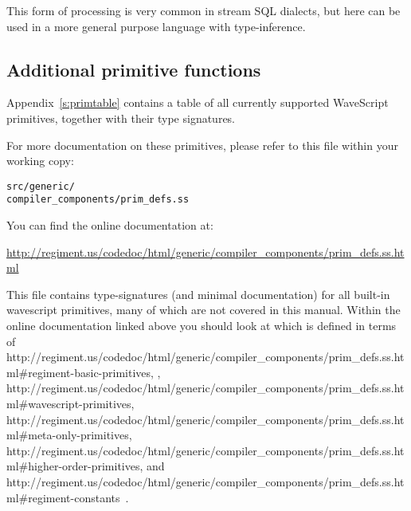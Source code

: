 \documentclass[twocolumn]{report}
\newcommand{\ws}{WaveScript}
\begin{document}
This form of processing is very common in stream SQL dialects, but
here can be used in a more general purpose language with type-inference.

\subsection{Additional primitive functions}

Appendix~\ref{s:primtable} contains a table of all currently supported
{\ws} primitives, together with their type signatures.

For more documentation on these primitives, please refer to this file
within your working copy:
\vspace{-2mm}
\begin{center}
{\tt{src/generic/\\compiler\_components/prim\_defs.ss}}
\end{center}

You can find the online documentation at:
\vspace{-2mm}
\begin{center}
\url{http://regiment.us/codedoc/html/generic/compiler\_components/prim\_defs.ss.html}
\end{center}




This file contains type-signatures (and minimal documentation) for all built-in
wavescript primitives, many of which are not covered in this manual.
Within the online documentation linked above you should look at 
which is defined in terms of 
      {http://regiment.us/codedoc/html/generic/compiler\_components/prim\_defs.ss.html\#regiment-basic-primitives},
,
          {http://regiment.us/codedoc/html/generic/compiler\_components/prim\_defs.ss.html\#wavescript-primitives},
           {http://regiment.us/codedoc/html/generic/compiler\_components/prim\_defs.ss.html\#meta-only-primitives},
        {http://regiment.us/codedoc/html/generic/compiler\_components/prim\_defs.ss.html\#higher-order-primitives},
and
             {http://regiment.us/codedoc/html/generic/compiler\_components/prim\_defs.ss.html\#regiment-constants}~.
\end{document}
